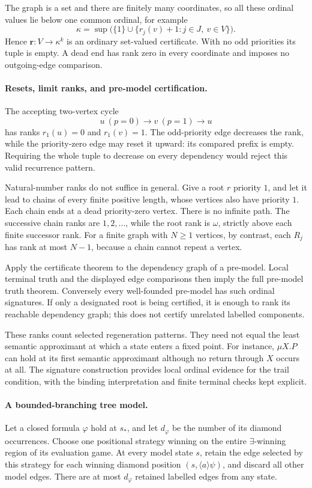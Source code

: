 The graph is a set and
there are finitely many
coordinates, so all these
ordinal values lie below
one common ordinal, for
example
\[
 \kappa=\sup\bigl(\{1\}\cup
       \{r_j(v)+1:j\in J,\ v\in V\}\bigr).
\]
Hence \(\mathbf r:V\to\kappa^k\)
is an ordinary set-valued
certificate. With no odd
priorities its tuple is
empty. A dead end has
rank zero in every
coordinate and imposes
no outgoing-edge comparison.

\paragraph{Resets, limit ranks, and pre-model certification.}
The accepting two-vertex cycle
\[
 u\ (p=0)\longrightarrow
 v\ (p=1)\longrightarrow u
\]
has ranks \(r_1(u)=0\)
and \(r_1(v)=1\).
The odd-priority edge
decreases the rank, while
the priority-zero edge
may reset it upward:
its compared prefix is
empty. Requiring the
whole tuple to decrease
on every dependency
would reject this valid
recurrence pattern.

Natural-number ranks do
not suffice in general.
Give a root \(r\)
priority \(1\), and let
it lead to chains of
every finite positive
length, whose vertices
also have priority \(1\).
Each chain ends at a
dead priority-zero vertex.
There is no infinite
path. The successive chain
ranks are \(1,2,\ldots\),
while the root rank is
\(\omega\), strictly above
each finite successor rank.
For a finite graph with
\(N\geq1\) vertices, by
contrast, each \(R_j\)
has rank at most \(N-1\),
because a chain cannot
repeat a vertex.

Apply the certificate theorem
to the dependency graph
of a pre-model.
Local terminal truth and
the displayed edge comparisons
then imply the full
pre-model truth theorem.
Conversely every well-founded
pre-model has such ordinal
signatures. If only a
designated root is being
certified, it is enough
to rank its reachable
dependency graph; this
does not certify unrelated
labelled components.

These ranks count selected
regeneration patterns. They
need not equal the least
semantic approximant at
which a state enters
a fixed point.
For instance, \(\mu X.P\)
can hold at its first
semantic approximant although
no return through \(X\)
occurs at all.
The signature construction
provides local ordinal
evidence for the trail
condition, with the binding
interpretation and finite
terminal checks kept explicit.

\paragraph{A bounded-branching tree model.}
Let a closed formula \(\varphi\) hold at
\(s_*\), and let \(d_\varphi\) be the
number of its diamond occurrences.
Choose one positional strategy winning
on the entire \(\exists\)-winning region
of its evaluation game.
At every model state \(s\), retain the
edge selected by this strategy for each
winning diamond position
\((s,\langle a\rangle\psi)\), and discard
all other model edges. There are at
most \(d_\varphi\) retained labelled
edges from any state.

